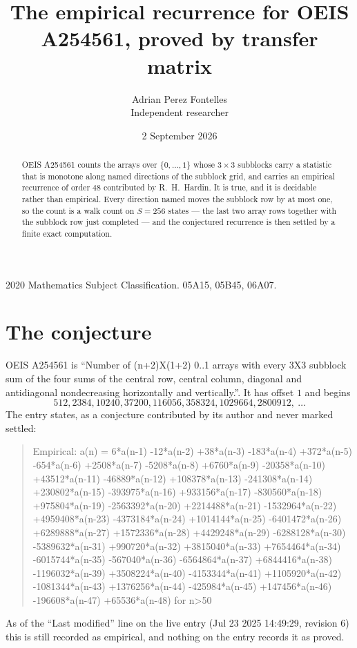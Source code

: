 \documentclass[11pt,a4paper]{article}
\title{The empirical recurrence for OEIS A254561, proved by transfer matrix}
\author{Adrian Perez Fontelles\\ \small Independent researcher}
\date{2 September 2026}
\theoremstyle{plain}
\theoremstyle{definition}
\begin{document}
\maketitle

\begin{abstract}
OEIS A254561 counts the arrays over $\{0,\dots,1\}$ whose $3\times3$ subblocks carry a
statistic that is monotone along named directions of the subblock grid, and carries an
empirical recurrence of order $48$ contributed by R.~H.~Hardin. It is true, and it is
decidable rather than empirical. Every direction named moves the subblock row by at most one,
so the count is a walk count on $S=256$ states --- the last two array rows together with the
subblock row just completed --- and the conjectured recurrence is then settled by a finite
exact computation.
\end{abstract}

\noindent\small 2020 Mathematics Subject Classification. 05A15, 05B45, 06A07.\normalsize

\section{The conjecture}

OEIS A254561 is ``Number of (n+2)X(1+2) 0..1 arrays with every 3X3 subblock sum of the four sums of the central row, central column, diagonal and antidiagonal nondecreasing horizontally and vertically.''. It has offset $1$ and begins
\[
512, 2384, 10240, 37200, 116056, 358324, 1029664, 2800912,\ \dots
\]
The entry states, as a conjecture contributed by its author and never marked settled:
\begin{quote}
Empirical: a(n) = 6*a(n-1) -12*a(n-2) +38*a(n-3) -183*a(n-4) +372*a(n-5) -654*a(n-6) +2508*a(n-7) -5208*a(n-8) +6760*a(n-9) -20358*a(n-10) +43512*a(n-11) -46889*a(n-12) +108378*a(n-13) -241308*a(n-14) +230802*a(n-15) -393975*a(n-16) +933156*a(n-17) -830560*a(n-18) +975804*a(n-19) -2563392*a(n-20) +2214488*a(n-21) -1532964*a(n-22) +4959408*a(n-23) -4373184*a(n-24) +1014144*a(n-25) -6401472*a(n-26) +6289888*a(n-27) +1572336*a(n-28) +4429248*a(n-29) -6288128*a(n-30) -5389632*a(n-31) +990720*a(n-32) +3815040*a(n-33) +7654464*a(n-34) -6015744*a(n-35) -567040*a(n-36) -6564864*a(n-37) +6844416*a(n-38) -1196032*a(n-39) +3508224*a(n-40) -4153344*a(n-41) +1105920*a(n-42) -1081344*a(n-43) +1376256*a(n-44) -425984*a(n-45) +147456*a(n-46) -196608*a(n-47) +65536*a(n-48) for n>50
\end{quote}
As of the ``Last modified'' line on the live entry (Jul 23 2025 14:49:29, revision 6) this is still
recorded as empirical, and nothing on the entry records it as proved.
\end{document}
